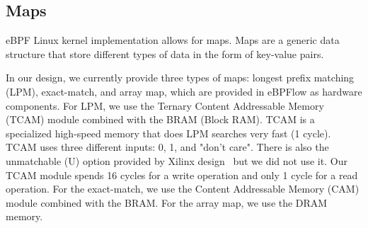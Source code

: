 \subsection{Maps}
\label{ssec:maps}

eBPF Linux kernel implementation allows for maps. Maps are a generic data structure that store different types of data in the form of key-value pairs. 

In our design, we currently provide three types of maps: longest prefix matching (LPM), exact-match, and array map, which are provided in eBPFlow as hardware components. For LPM, we use the Ternary Content Addressable Memory (TCAM) module combined with the BRAM (Block RAM). TCAM is a specialized high-speed memory that does LPM searches very fast (1 cycle). TCAM uses three different inputs: 0, 1,  and "don't care". There is also the unmatchable (U) option provided by Xilinx design~\cite{xilinx_IP_2018} but we did not use it. Our TCAM module spends 16 cycles for a write operation and only 1 cycle for a read operation. For the exact-match, we use the Content Addressable Memory (CAM) module combined with the BRAM. For the array map, we use the DRAM memory.

